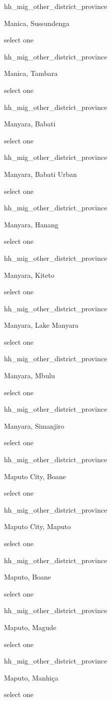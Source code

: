 \documentclass[]{article}
\begin{document}
hh\_mig\_other\_district\_province

Manica, Sussundenga

select one

hh\_mig\_other\_district\_province

Manica, Tambara

select one

hh\_mig\_other\_district\_province

Manyara, Babati

select one

hh\_mig\_other\_district\_province

Manyara, Babati Urban

select one

hh\_mig\_other\_district\_province

Manyara, Hanang

select one

hh\_mig\_other\_district\_province

Manyara, Kiteto

select one

hh\_mig\_other\_district\_province

Manyara, Lake Manyara

select one

hh\_mig\_other\_district\_province

Manyara, Mbulu

select one

hh\_mig\_other\_district\_province

Manyara, Simanjiro

select one

hh\_mig\_other\_district\_province

Maputo City, Boane

select one

hh\_mig\_other\_district\_province

Maputo City, Maputo

select one

hh\_mig\_other\_district\_province

Maputo, Boane

select one

hh\_mig\_other\_district\_province

Maputo, Magude

select one

hh\_mig\_other\_district\_province

Maputo, Manhiça

select one
\end{document}
